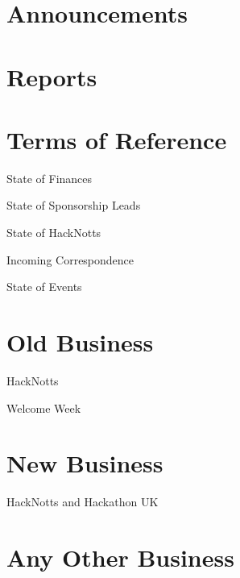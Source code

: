 \documentclass[11pt,hacksoc,agenda]{meetingmins}
\begin{document}
\maketitle

\section{Announcements}
\begin{items}
\item
\end{items}

\section{Reports}

\section{Terms of Reference}
\begin{items}
\item {State of Finances}
\item {State of Sponsorship Leads}
\item {State of HackNotts}
\item {Incoming Correspondence}
\item {State of Events}
\end{items}

\section{Old Business}
\begin{items}
\item{HackNotts}
\item{Welcome Week}
\end{items}

\section{New Business}
\begin{items}
\item{HackNotts and Hackathon UK}
\end{items}

\section{Any Other Business}

\vspace{1em}
\end{document}
